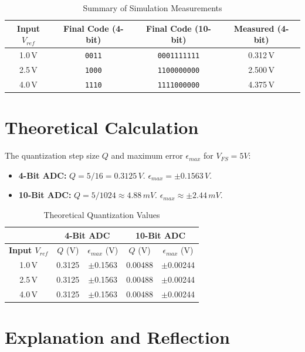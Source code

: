 \documentclass[12pt]{article}
\begin{document}
\begin{table}[H]
    \centering
    \begin{tabular}{cccc}
        \toprule
        \textbf{Input $V_{ref}$} & \textbf{Final Code (4-bit)} & \textbf{Final Code (10-bit)} & \textbf{Measured (4-bit)} \\ \midrule
        1.0\,V & \texttt{0011} & \texttt{0001111111} & 0.312\,V \\
        2.5\,V & \texttt{1000} & \texttt{1100000000} & 2.500\,V \\
        4.0\,V & \texttt{1110} & \texttt{1111000000} & 4.375\,V \\ \bottomrule
    \end{tabular}
    \caption{Summary of Simulation Measurements}
\end{table}

\section*{Theoretical Calculation}

The quantization step size $Q$ and maximum error $\epsilon_{max}$ for $V_{FS} = 5V$:
\begin{itemize}
    \item \textbf{4-Bit ADC:} $Q = 5/16 = 0.3125\,V$. $\epsilon_{max} = \pm 0.1563\,V$.
    \item \textbf{10-Bit ADC:} $Q = 5/1024 \approx 4.88\,mV$. $\epsilon_{max} \approx \pm 2.44\,mV$.
\end{itemize}

\begin{table}[H]
    \centering
    \begin{tabular}{|c|c|c|c|c|}
        \hline
        & \multicolumn{2}{c|}{\textbf{4-Bit ADC}} & \multicolumn{2}{c|}{\textbf{10-Bit ADC}} \\ \hline
        \textbf{Input $V_{ref}$} & $Q$ (V) & $\epsilon_{max}$ (V) & $Q$ (V) & $\epsilon_{max}$ (V) \\ \hline
        1.0\,V & 0.3125 & $\pm$0.1563 & 0.00488 & $\pm$0.00244 \\ \hline
        2.5\,V & 0.3125 & $\pm$0.1563 & 0.00488 & $\pm$0.00244 \\ \hline
        4.0\,V & 0.3125 & $\pm$0.1563 & 0.00488 & $\pm$0.00244 \\ \hline
    \end{tabular}
    \caption{Theoretical Quantization Values}
\end{table}

\section*{Explanation and Reflection}
\end{document}
